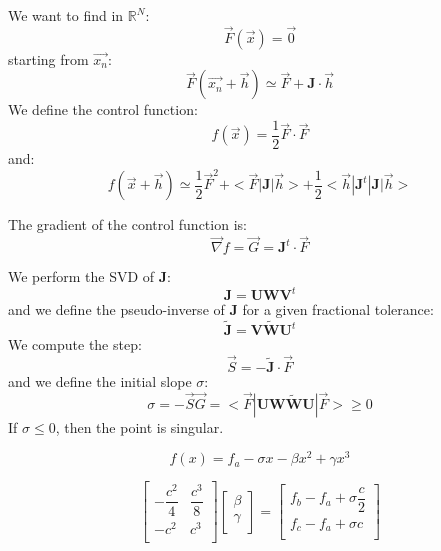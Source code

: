 \documentclass[aps,12pt]{revtex4}
\begin{document}
We want to find in $\mathbb{R}^N$:
\begin{equation}
	\vec{F}(\vec{x}) = \vec{0}
\end{equation}
starting from $\vec{x_n}$:
\begin{equation}
	\vec{F}(\vec{x_n}+\vec{h}) \simeq \vec{F} + \bm{J} \cdot \vec{h}
\end{equation}
We define the control function:
\begin{equation}
	f(\vec{x}) = \dfrac{1}{2} \vec{F} \cdot \vec{F}
\end{equation}
and:
\begin{equation}
	f(\vec{x}+\vec{h}) \simeq \dfrac{1}{2}\vec{F}^2 + <\vec{F} | \bm{J} | \vec{h} > + \dfrac{1}{2} <\vec{h}|\bm{J}^t | \bm{J} | \vec{h}>
\end{equation}

The gradient of the control function is:
\begin{equation}
	\vec{\nabla} f = \vec{G} = \bm{J}^t \cdot \vec{F}
\end{equation}

We perform the SVD of $\bm{J}$:
\begin{equation}
	\bm{J} = \bm{U} \bm{W} \bm{V}^t
\end{equation}
and we define the pseudo-inverse of $\bm{J}$ for a given fractional tolerance:
\begin{equation}
	\tilde{\bm{J}} = \bm{V} \tilde{\bm{W}} \bm{U}^t
\end{equation}	
We compute the step:
\begin{equation}
	\vec{S} = - \tilde{\bm{J}} \cdot \vec{F} 
\end{equation}
and we define the initial slope $\sigma$:
\begin{equation}
	\sigma = -\vec{S}\vec{G} = <\vec{F}| \bm{U} \bm{W}\tilde{\bm{W}}\bm{U}|\vec{F}> \geq 0
\end{equation}
If $\sigma\leq 0$, then the point is singular.

\begin{equation}
f(x) = f_a - \sigma x - \beta x^2 +  \gamma  x^3
\end{equation}

 
\begin{equation}
\begin{bmatrix}
	-\dfrac{c^2}{4} & \dfrac{c^3}{8} \\
	-c^2 & c^3 \\
\end{bmatrix}
\begin{bmatrix}
	\beta\\
	\gamma\\
\end{bmatrix}
=
\begin{bmatrix}
	f_b - f_a + \sigma \dfrac{c}{2}\\
	f_c - f_a + \sigma c\\
\end{bmatrix}
\end{equation}
\end{document}
